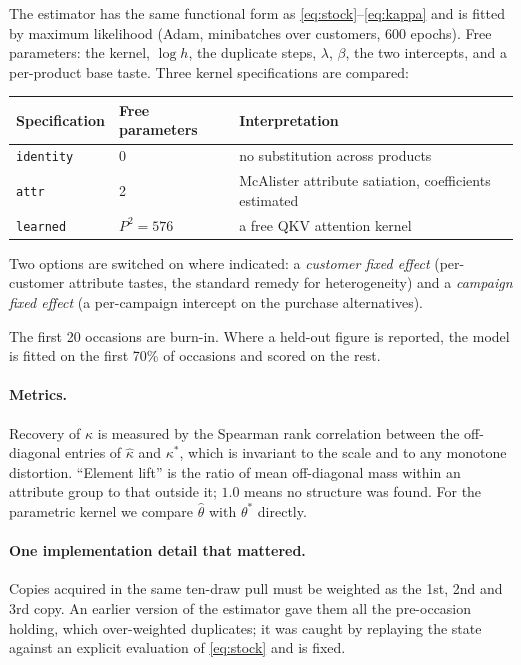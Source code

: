 \documentclass[11pt]{article}
\begin{document}
The estimator has the same functional form as \eqref{eq:stock}--\eqref{eq:kappa}
and is fitted by maximum likelihood (Adam, minibatches over customers, 600
epochs). Free parameters: the kernel, $\log h$, the duplicate steps, $\lambda$,
$\beta$, the two intercepts, and a per-product base taste. Three kernel
specifications are compared:

\begin{center}\small
\begin{tabular}{lll}
\toprule
Specification & Free parameters & Interpretation \\
\midrule
\texttt{identity} & 0 & no substitution across products \\
\texttt{attr} & 2 & McAlister attribute satiation, coefficients estimated \\
\texttt{learned} & $P^2 = 576$ & a free QKV attention kernel \\
\bottomrule
\end{tabular}
\end{center}

\noindent Two options are switched on where indicated: a \emph{customer fixed
effect} (per-customer attribute tastes, the standard remedy for heterogeneity)
and a \emph{campaign fixed effect} (a per-campaign intercept on the purchase
alternatives).

The first 20 occasions are burn-in. Where a held-out figure is reported, the
model is fitted on the first 70\% of occasions and scored on the rest.

\paragraph{Metrics.} Recovery of $\kappa$ is measured by the Spearman rank
correlation between the off-diagonal entries of $\hat\kappa$ and $\kappa^{*}$,
which is invariant to the scale and to any monotone distortion. ``Element
lift'' is the ratio of mean off-diagonal mass within an attribute group to that
outside it; $1.0$ means no structure was found. For the parametric kernel we
compare $\hat\theta$ with $\theta^{*}$ directly.

\paragraph{One implementation detail that mattered.} Copies acquired in the
same ten-draw pull must be weighted as the 1st, 2nd and 3rd copy. An earlier
version of the estimator gave them all the pre-occasion holding, which
over-weighted duplicates; it was caught by replaying the state against an
explicit evaluation of \eqref{eq:stock} and is fixed.
\end{document}
